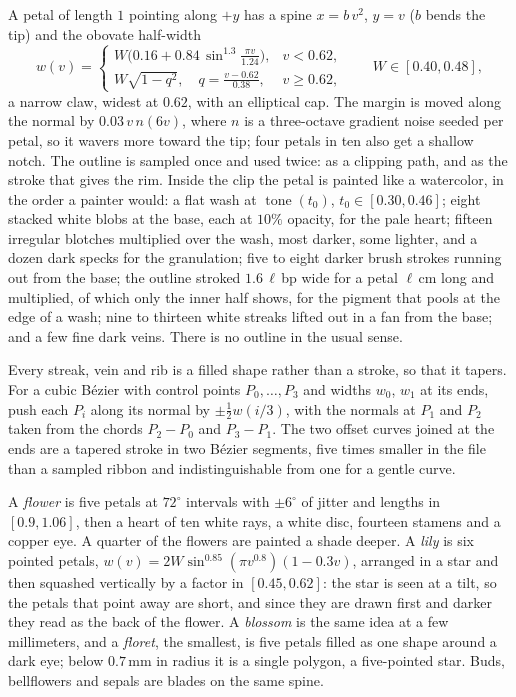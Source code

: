 \begin{construction}[Petal]
A petal of length $1$ pointing along $+y$ has a spine $x=b\,v^2$, $y=v$ ($b$ bends the
tip) and the obovate half-width
\[
  w(v)=\begin{cases}
    W\bigl(0.16+0.84\,\sin^{1.3}\frac{\pi v}{1.24}\bigr), & v<0.62,\\[2pt]
    W\sqrt{1-q^2},\quad q=\frac{v-0.62}{0.38}, & v\ge 0.62,
  \end{cases}
  \qquad W\in[0.40,0.48],
\]
a narrow claw, widest at $0.62$, with an elliptical cap. The margin is moved along the
normal by $0.03\,v\,n(6v)$, where $n$ is a three-octave gradient noise seeded per petal, so
it wavers more toward the tip; four petals in ten also get a shallow notch. The outline is
sampled once and used twice: as a clipping path, and as the stroke that gives the rim.
Inside the clip the petal is painted like a watercolor, in the order a painter would: a
flat wash at $\operatorname{tone}(t_0)$, $t_0\in[0.30,0.46]$; eight stacked white blobs at
the base, each at $10\%$ opacity, for the pale heart; fifteen irregular blotches
multiplied over the wash, most darker, some lighter, and a dozen dark specks for the
granulation; five to eight darker brush strokes running out from the base; the outline
stroked $1.6\,\ell\,$bp wide for a petal $\ell\,$cm long and multiplied, of which only the inner half shows, for the pigment
that pools at the edge of a wash; nine to thirteen white streaks lifted out in a fan from
the base; and a few fine dark veins. There is no outline in the usual sense.
\end{construction}

\begin{construction}
Every streak, vein and rib is a filled shape rather than a stroke, so that it tapers. For a
cubic B\'ezier with control points $P_0,\dots,P_3$ and widths $w_0$, $w_1$ at its ends, push
each $P_i$ along its normal by $\pm\frac12 w(i/3)$, with the normals at $P_1$ and $P_2$ taken
from the chords $P_2-P_0$ and $P_3-P_1$. The two offset curves joined at the ends are a
tapered stroke in two B\'ezier segments, five times smaller in the file than a sampled
ribbon and indistinguishable from one for a gentle curve.
\end{construction}

\begin{construction}[Flowers]
A \emph{flower} is five petals at $72^\circ$ intervals with $\pm6^\circ$ of jitter and lengths
in $[0.9,1.06]$, then a heart of ten white rays, a white disc, fourteen stamens and a copper
eye. A quarter of the flowers are painted a shade deeper. A \emph{lily} is six pointed
petals, $w(v)=2W\sin^{0.85}(\pi v^{0.8})(1-0.3v)$, arranged in a star and then squashed
vertically by a factor in $[0.45,0.62]$: the star is seen at a tilt, so the petals that point
away are short, and since they are drawn first and darker they read as the back of the
flower. A \emph{blossom} is the same idea at a few millimeters, and a \emph{floret}, the
smallest, is five petals filled as one shape around a dark eye; below $0.7\,$mm in radius it is a
single polygon, a five-pointed star. Buds, bellflowers and sepals are blades on the same spine.
\end{construction}

